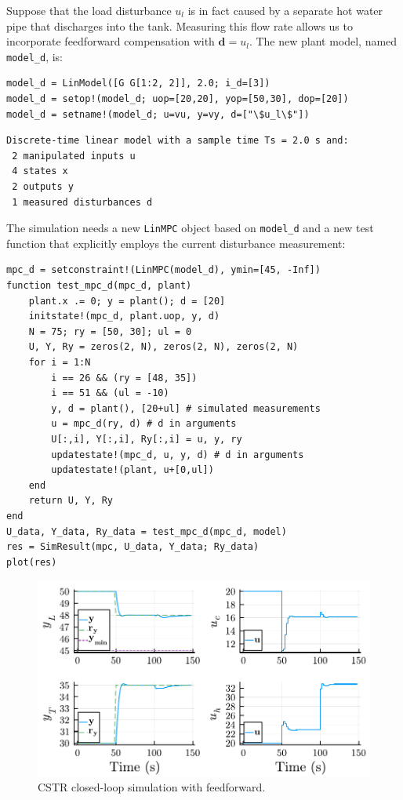 Suppose that the load disturbance $u_l$ is in fact caused by a separate hot water pipe that discharges into the tank. Measuring this flow rate allows us to incorporate feedforward compensation with $\mathbf{d}=u_l$. The new plant model, named \texttt{model\_d}, is:
\begin{verbatim}
model_d = LinModel([G G[1:2, 2]], 2.0; i_d=[3])
model_d = setop!(model_d; uop=[20,20], yop=[50,30], dop=[20])
model_d = setname!(model_d; u=vu, y=vy, d=["\$u_l\$"])
\end{verbatim}
\spacerepl
\begin{verbatim}
Discrete-time linear model with a sample time Ts = 2.0 s and:
 2 manipulated inputs u
 4 states x
 2 outputs y
 1 measured disturbances d
\end{verbatim}
The simulation needs a new \texttt{LinMPC} object based on \texttt{model\_d} and a new test function that explicitly employs the current disturbance measurement:
\begin{verbatim}
mpc_d = setconstraint!(LinMPC(model_d), ymin=[45, -Inf])
function test_mpc_d(mpc_d, plant)
    plant.x .= 0; y = plant(); d = [20]
    initstate!(mpc_d, plant.uop, y, d)
    N = 75; ry = [50, 30]; ul = 0
    U, Y, Ry = zeros(2, N), zeros(2, N), zeros(2, N)
    for i = 1:N
        i == 26 && (ry = [48, 35])
        i == 51 && (ul = -10)
        y, d = plant(), [20+ul] # simulated measurements
        u = mpc_d(ry, d) # d in arguments
        U[:,i], Y[:,i], Ry[:,i] = u, y, ry
        updatestate!(mpc_d, u, y, d) # d in arguments
        updatestate!(plant, u+[0,ul])
    end
    return U, Y, Ry
end
U_data, Y_data, Ry_data = test_mpc_d(mpc_d, model)
res = SimResult(mpc, U_data, Y_data; Ry_data)
plot(res)
\end{verbatim}

\begin{figure}[h]
    \centering
    \includegraphics[width=\columnwidth]{fig/plot_LinMPC2.pdf}
    \caption{CSTR closed-loop simulation with feedforward.}
    \label{fig:plot_LinMPC2}
\end{figure}


